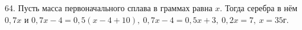 64. Пусть масса первоначального сплава в граммах равна $x.$ Тогда серебра в нём $0,7x$ и $0,7x-4=0,5(x-4+10),\ 0,7x-4=0,5x+3,\ 0,2x=7,\ x=35$г.\\
